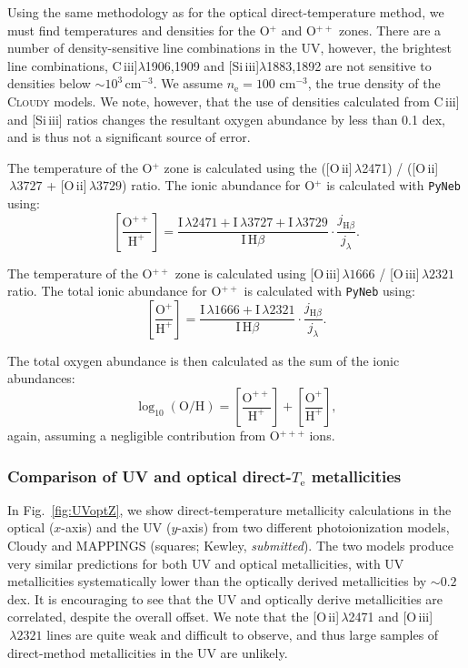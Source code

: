 \documentclass[preprint2]{aastex62}
\newcommand{\Cloudy}{\textsc{Cloudy}\xspace}
\newcommand{\oiii}{[O\,{\sc iii}]\xspace}
\newcommand{\oii}{[O\,{\sc ii}]\xspace}
\newcommand{\SiuIII}{[Si\,{\sc iii}]\xspace}
\newcommand{\ciii}{C\,{\sc iii}]\xspace}
\newcommand{\Te}{\ensuremath{T_{\mathrm{e}}}\xspace}
\begin{document}
Using the same methodology as for the optical direct-temperature method, we must find temperatures and densities for the O$^{+}$ and O$^{++}$ zones. There are a number of density-sensitive line combinations in the UV, however, the brightest line combinations, \ciii$\lambda$1906,1909 and \SiuIII$\lambda$1883,1892 are not sensitive to densities below $\sim10^3\,$cm$^{-3}$. We assume $n_{\mathrm{e}} = 100$ cm$^{-3}$, the true density of the \Cloudy models. We note, however, that the use of densities calculated from \ciii and \SiuIII ratios changes the resultant oxygen abundance by less than 0.1 dex, and is thus not a significant source of error.

The temperature of the O$^{+}$ zone is calculated using the (\oii$\,\lambda$2471) / (\oii$\,\lambda 3727$ + \oii$\,\lambda 3729$) ratio. The ionic abundance for O$^{+}$ is calculated with {\tt PyNeb} using:
\begin{equation}
    \left[ \frac{\mathrm{O}^{++}}{\mathrm{H}^{+}} \right] = \frac{\mathrm{I}\,\lambda 2471 +\mathrm{I}\,\lambda 3727 + \mathrm{I}\,\lambda 3729}{\mathrm{I}\,\mathrm{H}\beta} \cdot \frac{j_{\mathrm{H}\beta}}{j_{\lambda}}.
\end{equation}

The temperature of the O$^{++}$ zone is calculated using \oiii$\,\lambda1666$ / \oiii$\,\lambda2321$ ratio. The total ionic abundance for O$^{++}$ is calculated with {\tt PyNeb} using:
\begin{equation}
    \left[ \frac{\mathrm{O}^{+}}{\mathrm{H}^{+}} \right] = \frac{\mathrm{I}\,\lambda 1666 +\mathrm{I}\,\lambda 2321}{\mathrm{I}\,\mathrm{H}\beta} \cdot \frac{j_{\mathrm{H}\beta}}{j_{\lambda}}.
\end{equation}

The total oxygen abundance is then calculated as the sum of the ionic abundances:
\begin{equation}
    \log_{10}(\mathrm{O}/\mathrm{H}) = \left[ \frac{\mathrm{O}^{++}}{\mathrm{H}^{+}} \right] + \left[ \frac{\mathrm{O}^{+}}{\mathrm{H}^{+}} \right],
\end{equation}
again, assuming a negligible contribution from O$^{+++}$ ions.

\subsubsection{Comparison of UV and optical direct-\Te metallicities}

In Fig.~\ref{fig:UVoptZ}, we show direct-temperature metallicity calculations in the optical ($x$-axis) and the UV ($y$-axis) from two different photoionization models, Cloudy \citep[circles;][]{Byler+2018} and MAPPINGS (squares; Kewley, \emph{submitted}). The two models produce very similar predictions for both UV and optical metallicities, with UV metallicities systematically lower than the optically derived metallicities by $\sim0.2$\,dex. It is encouraging to see that the UV and optically derive metallicities are correlated, despite the overall offset. We note that the \oii$\,\lambda$2471 and \oiii$\,\lambda2321$ lines are quite weak and difficult to observe, and thus large samples of direct-method metallicities in the UV are unlikely.
\end{document}
